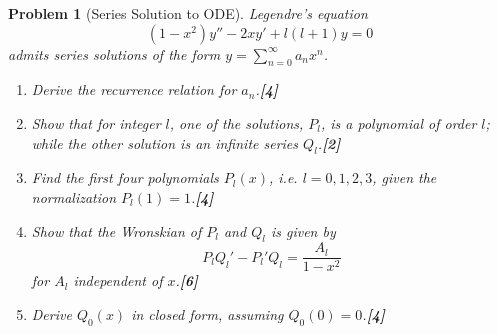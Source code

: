 \documentclass[a4paper]{article}
\theoremstyle{new}
\newtheorem{qns}{Problem}[section]
\begin{document}
\newpage
\begin{qns}[Series Solution to ODE]
Legendre's equation
$$(1-x^2)y''-2xy'+l(l+1)y=0$$
admits series solutions of the form $y=\sum_{n=0}^\infty a_nx^n$.
\begin{enumerate}[label=(\alph*)]
\item Derive the recurrence relation for $a_n$.\hfill \textbf{[4]}
\item Show that for integer $l$, one of the solutions, $P_l$, is  a polynomial of order $l$; while the other solution is an infinite series $Q_l$.\hfill \textbf{[2]}
\item Find the first four polynomials $P_l(x)$, i.e. $l=0,1,2,3$, given the normalization $P_l(1)=1$.\hfill \textbf{[4]}
\item Show that the Wronskian of $P_l$ and $Q_l$ is given by
$$P_lQ_l'-P_l'Q_l=\frac{A_l}{1-x^2}$$
for $A_l$ independent of $x$.\hfill \textbf{[6]}
\item Derive $Q_0(x)$ in closed form, assuming $Q_0(0)=0$.\hfill \textbf{[4]}
\end{enumerate}
\end{qns}
\end{document}
